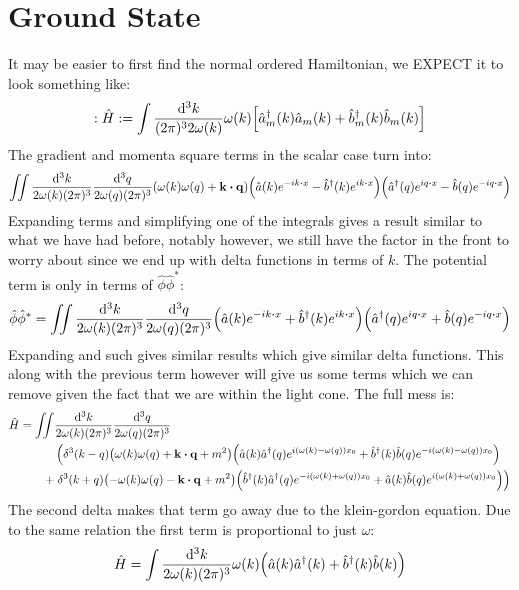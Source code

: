 \documentclass[12pt]{article}
\newcommand{\phih}{\hat{\phi}}
\newcommand{\phish}{\hat{\phi}^*}
\newcommand{\ahat}{\hat{a}}
\newcommand{\ahatd}{\hat{a}^\dag}
\newcommand{\bhat}{\hat{b}}
\newcommand{\bhatd}{\hat{b}^\dag}
\begin{document}
\section{Ground State}
It may be easier to first find the normal ordered Hamiltonian, we EXPECT it to look something like:
\begin{align*}
  :\hat{H}:=\int\frac{\dd[3]{k}}{(2\pi)^32\omega(k)}\omega(k)
  \qty[\ahatd_m(k)\ahat_m(k)+\bhatd_m(k)\bhat_m(k)]
\end{align*}
The gradient and momenta square terms in the scalar case turn into:
\begin{align*}
  \iint\frac{\dd[3]{k}}{2\omega(k)(2\pi)^3}\frac{\dd[3]{q}}{2\omega(q)(2\pi)^3}
  \qty(\omega(k)\omega(q)+\vb{k}\vdot\vb{q})
  \qty(\ahat(k)e^{-ik\vdot x}-\bhatd(k)e^{ik\vdot x})
  \qty(\ahatd(q)e^{iq\vdot x}-\bhat(q)e^{-iq\vdot x})
\end{align*}
Expanding terms and simplifying one of the integrals gives a result similar to what we have had before, notably however, we still have the factor in the front to worry about since we end up with delta functions in terms of $k$. The potential term is only in terms of $\phih\phish$:
\begin{align*}
  \phih\phish=
  \iint\frac{\dd[3]{k}}{2\omega(k)(2\pi)^3}\frac{\dd[3]{q}}{2\omega(q)(2\pi)^3}
  \qty(\ahat(k)e^{-ik\vdot x}+\bhatd(k)e^{ik\vdot x})
  \qty(\ahatd(q)e^{iq\vdot x}+\bhat(q)e^{-iq\vdot x})
\end{align*}
Expanding and such gives similar results which give similar delta functions. This along with the previous term however will give us some terms which we can remove given the fact that we are within the light cone. The full mess is:
\begin{align*}
  \hat{H}=\iint&\frac{\dd[3]{k}}{2\omega(k)(2\pi)^3}
  \frac{\dd[3]{q}}{2\omega(q)(2\pi)^3}\\
  &\left(\delta^3(k-q)\qty(\omega(k)\omega(q)+\vb{k\vdot q}+m^2)
    \qty(\ahat(k)\ahatd(q)e^{i(\omega(k)-\omega(q))x_0}
    +\bhatd(k)\bhat(q)e^{-i(\omega(k)-\omega(q))x_0})\right.\\
  +&\left.\delta^3(k+q)\qty(-\omega(k)\omega(q)-\vb{k\vdot q}+m^2)
    \qty(\bhatd(k)\ahatd(q)e^{-i(\omega(k)+\omega(q))x_0}
    +\ahat(k)\bhat(q)e^{i(\omega(k)+\omega(q))x_0})\right)
\end{align*}
The second delta makes that term go away due to the klein-gordon equation. Due to the same relation the first term is proportional to just $\omega$:
\begin{align*}
  \hat{H}=\int\frac{\dd[3]{k}}{2\omega(k)(2\pi)^3}\omega(k)
  \qty(\ahat(k)\ahatd(k)+\bhatd(k)\bhat(k))
\end{align*}
\end{document}
